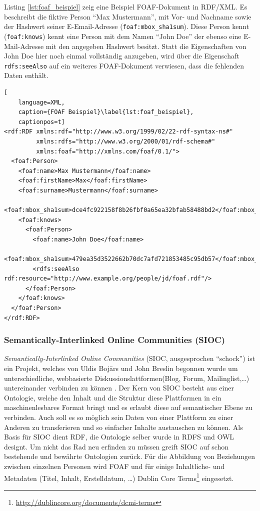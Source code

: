 Listing \ref{lst:foaf_beispiel} zeig eine Beispiel FOAF-Dokument in RDF/XML. Es beschreibt die fiktive Person \enquote{Max Mustermann}, mit Vor- und Nachname sowie der Hashwert seiner E-Email-Adresse (\texttt{foaf:mbox\_sha1sum}). Diese Person kennt (\texttt{foaf:knows}) kennt eine Person mit dem Namen \enquote{John Doe} der ebenso eine E-Mail-Adresse mit den angegeben Hashwert besitzt. Statt die Eigenschaften von John Doe hier noch einmal vollständig anzugeben, wird über die Eigenschaft \texttt{rdfs:seeAlso} auf ein weiteres FOAF-Dokument verwiesen, dass die fehlenden Daten enthält. 

\begin{lstlisting}[
    language=XML,
    caption={FOAF Beispiel}\label{lst:foaf_beispiel},
    captionpos=t]
<rdf:RDF xmlns:rdf="http://www.w3.org/1999/02/22-rdf-syntax-ns#"
         xmlns:rdfs="http://www.w3.org/2000/01/rdf-schema#"
         xmlns:foaf="http://xmlns.com/foaf/0.1/">
  <foaf:Person>
    <foaf:name>Max Mustermann</foaf:name>
    <foaf:firstName>Max</foaf:firstName>
    <foaf:surname>Mustermann</foaf:surname>
    <foaf:mbox_sha1sum>dce4fc922158f8b26fbf0a65ea32bfab58488bd2</foaf:mbox_sha1sum>
    <foaf:knows>
      <foaf:Person>
        <foaf:name>John Doe</foaf:name>
        <foaf:mbox_sha1sum>479ea35d3522662b70dc7afd721853485c95db57</foaf:mbox_sha1sum>
        <rdfs:seeAlso rdf:resource="http://www.example.org/people/jd/foaf.rdf"/>
      </foaf:Person>
    </foaf:knows>
  </foaf:Person>
</rdf:RDF>
\end{lstlisting}


\subsubsection{Semantically-Interlinked Online Communities (SIOC)} %
\label{ssub:semantically_interlinked_online_communities}

\emph{Semantically-Interlinked Online Communities} (SIOC, ausgesprochen \enquote{schock}) ist ein Projekt, welches von Uldis Boj\=ars und John Breslin begonnen wurde um unterschiedliche, webbasierte Diskussionslattformen(Blog, Forum, Mailinglist,\dots) untereinander verbinden zu können \cite{deri2013,Breslin2005,Bojars2008a}. Der Kern von SIOC besteht aus einer Ontologie, welche den Inhalt und die Struktur diese Plattformen in ein maschinenlesbares Format bringt und es erlaubt diese auf semantischer Ebene zu verbinden. Auch soll es so möglich sein Daten von einer Plattform zu einer Anderen zu transferieren und so einfacher Inhalte austauschen zu können. Als Basis für SIOC dient RDF, die Ontologie selber wurde in RDFS und OWL designt. Um nicht das Rad neu erfinden zu müssen greift SIOC auf schon bestehende und bewährte Ontologien zurück. Für die Abbildung von Beziehungen zwischen einzelnen Personen wird FOAF und für einige Inhaltliche- und Metadaten (Titel, Inhalt, Erstelldatum, \dots) Dublin Core Terms\footnote{\url{http://dublincore.org/documents/dcmi-terms}} eingesetzt.


